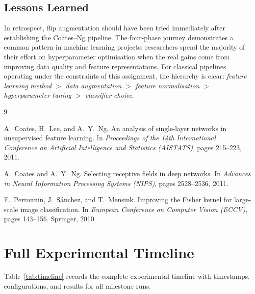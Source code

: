 \documentclass[11pt,a4paper]{article}
\begin{document}
\subsection{Lessons Learned}

In retrospect, flip augmentation should have been tried immediately after
establishing the Coates--Ng pipeline.  The four-phase journey demonstrates a
common pattern in machine learning projects: researchers spend the majority of
their effort on hyperparameter optimisation when the real gains come from
improving data quality and feature representations.  For classical pipelines
operating under the constraints of this assignment, the hierarchy is clear:
\emph{feature learning method $>$ data augmentation $>$ feature normalisation
$>$ hyperparameter tuning $>$ classifier choice}.

\begin{thebibliography}{9}

A.~Coates, H.~Lee, and A.~Y.~Ng.
\newblock An analysis of single-layer networks in unsupervised feature learning.
\newblock In \emph{Proceedings of the 14th International Conference on
Artificial Intelligence and Statistics (AISTATS)}, pages 215--223, 2011.

A.~Coates and A.~Y.~Ng.
\newblock Selecting receptive fields in deep networks.
\newblock In \emph{Advances in Neural Information Processing Systems (NIPS)},
pages 2528--2536, 2011.

F.~Perronnin, J.~S\'{a}nchez, and T.~Mensink.
\newblock Improving the {F}isher kernel for large-scale image classification.
\newblock In \emph{European Conference on Computer Vision (ECCV)}, pages
143--156. Springer, 2010.

\end{thebibliography}

\appendix
\section{Full Experimental Timeline}
\label{app:timeline}

Table~\ref{tab:timeline} records the complete experimental timeline with
timestamps, configurations, and results for all milestone runs.
\end{document}
